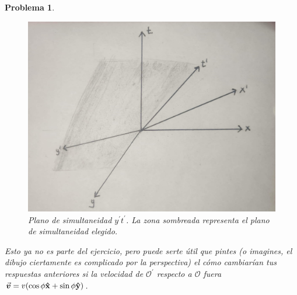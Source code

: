\documentclass[12pt]{article}
\theoremstyle{break}
\newtheorem{exercise}{Problema}
\theoremstyle{nonumberbreak}
\DeclareRobustCommand{\uvec}[1]{{%
  \ifcsname uvec#1\endcsname
     \csname uvec#1\endcsname
   \else
    \bm{\hat{\mathbf{#1}}}%
   \fi
}}%
\newcommand*{\observer}{\mathcal{O}}
\newcommand*{\primeobserver}{\mathcal{O}^{\prime}}
\begin{document}
\begin{exercise}
\begin{enumerate}[label = \alph*)]
            \begin{figure}[htb]
                \centering
                \includegraphics[scale = 0.2]{fig-10}
                \caption{Plano de simultaneidad \(y^{\prime}t^{\prime}\). La zona sombreada representa el plano de simultaneidad elegido.}
                \label{fig:simultainetyPlaneyprimetprime}
            \end{figure}
        \end{enumerate}
        Esto ya no es parte del ejercicio, pero puede serte útil que pintes (o imagines, el dibujo ciertamente es complicado por la perspectiva) el cómo cambiarían tus respuestas anteriores si la velocidad de \(\primeobserver\) respecto a \(\observer\) fuera \(\va*{v} = v(\cos\phi\uvec{x} + \sin\phi\uvec{y})\).
    \end{exercise}
\end{document}
